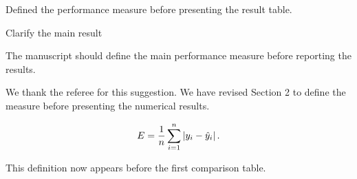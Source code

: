 \documentclass{paperreply}
\begin{document}
\PaperReplyMakeTitle

\begin{revisionsummary}
\item Defined the performance measure before presenting the result table.
\end{revisionsummary}


\begin{replypoint}[Revised]{Clarify the main result}
\begin{refereecomment}
The manuscript should define the main performance measure before reporting the results.
\end{refereecomment}

\begin{authorreply}
We thank the referee for this suggestion. We have revised Section 2 to define the measure before presenting the numerical results.

\begin{replyformula}
\[
  E = \frac{1}{n}\sum_{i=1}^{n}\left\lvert y_i-\hat{y}_i\right\rvert.
\]
\end{replyformula}

This definition now appears before the first comparison table.
\end{authorreply}
\end{replypoint}
\end{document}
